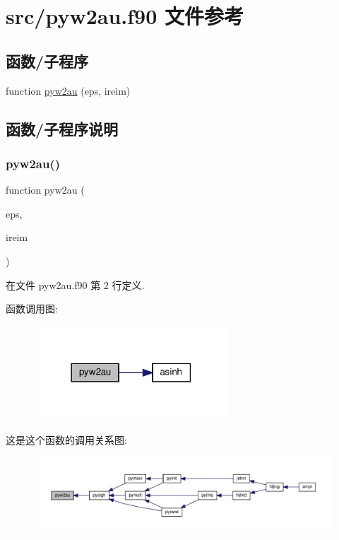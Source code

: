 \hypertarget{pyw2au_8f90}{}\section{src/pyw2au.f90 文件参考}
\label{pyw2au_8f90}
\subsection*{函数/子程序}
\begin{DoxyCompactItemize}
\item 
function \mbox{\hyperlink{pyw2au_8f90_a00a3bb5c30b561882bb06624987eb18a}{pyw2au}} (eps, ireim)
\end{DoxyCompactItemize}


\subsection{函数/子程序说明}
\mbox{\label{pyw2au_8f90_a00a3bb5c30b561882bb06624987eb18a}} 
\subsubsection{\texorpdfstring{pyw2au()}{pyw2au()}}
{\footnotesize\ttfamily function pyw2au (\begin{DoxyParamCaption}\item[{}]{eps,  }\item[{}]{ireim }\end{DoxyParamCaption})}



在文件 pyw2au.\+f90 第 2 行定义.

函数调用图\+:
\nopagebreak
\begin{figure}[H]
\begin{center}
\leavevmode
\includegraphics[width=206pt]{pyw2au_8f90_a00a3bb5c30b561882bb06624987eb18a_cgraph}
\end{center}
\end{figure}
这是这个函数的调用关系图\+:
\nopagebreak
\begin{figure}[H]
\begin{center}
\leavevmode
\includegraphics[width=350pt]{pyw2au_8f90_a00a3bb5c30b561882bb06624987eb18a_icgraph}
\end{center}
\end{figure}
